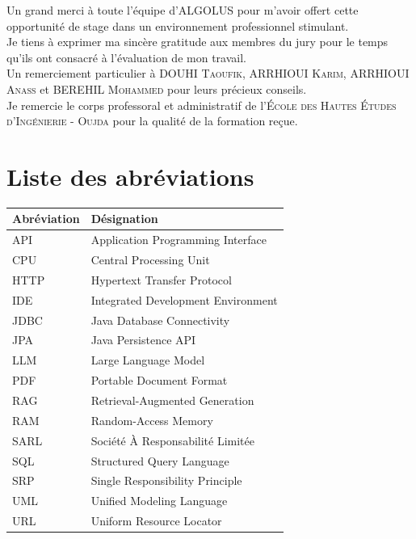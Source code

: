 \documentclass[12pt,a4paper]{report}
\begin{document}
	Un grand merci à toute l'équipe d'\textsc{ALGOLUS} pour m'avoir offert cette opportunité de stage dans un environnement professionnel stimulant.\\[0.6em]
	
	Je tiens à exprimer ma sincère gratitude aux membres du jury pour le temps qu’ils ont consacré à l’évaluation de mon travail.\\[0.6em]
	
	Un remerciement particulier à \textsc{DOUHI Taoufik}, \textsc{ARRHIOUI Karim}, \textsc{ARRHIOUI Anass} et \textsc{BEREHIL Mohammed} pour leurs précieux conseils.\\[0.6em]
			
	Je remercie le corps professoral et administratif de l'\textsc{École des Hautes Études d'Ingénierie - Oujda} pour la qualité de la formation reçue.
	
	\clearpage
	\chapter*{Liste des abréviations}
	
	\begin{table}[H]
		\centering
		\begin{tabular}{|l|l|}
			\hline
			\textbf{Abréviation} & \textbf{Désignation} \\
			\hline
			API & Application Programming Interface \\
			\hline
			CPU & Central Processing Unit \\
			\hline
			HTTP & Hypertext Transfer Protocol \\
			\hline
			IDE & Integrated Development Environment \\
			\hline
			JDBC & Java Database Connectivity \\
			\hline
			JPA & Java Persistence API \\
			\hline
			LLM & Large Language Model \\
			\hline
			PDF & Portable Document Format \\
			\hline
			RAG & Retrieval-Augmented Generation \\
			\hline
			RAM & Random-Access Memory \\
			\hline
			SARL & Société À Responsabilité Limitée \\
			\hline
			SQL & Structured Query Language \\
			\hline
			SRP & Single Responsibility Principle \\
			\hline
			UML & Unified Modeling Language \\
			\hline
			URL & Uniform Resource Locator \\
			\hline
		\end{tabular}
		\label{tab:liste-abréviations}
	\end{table}
	
\end{document}
